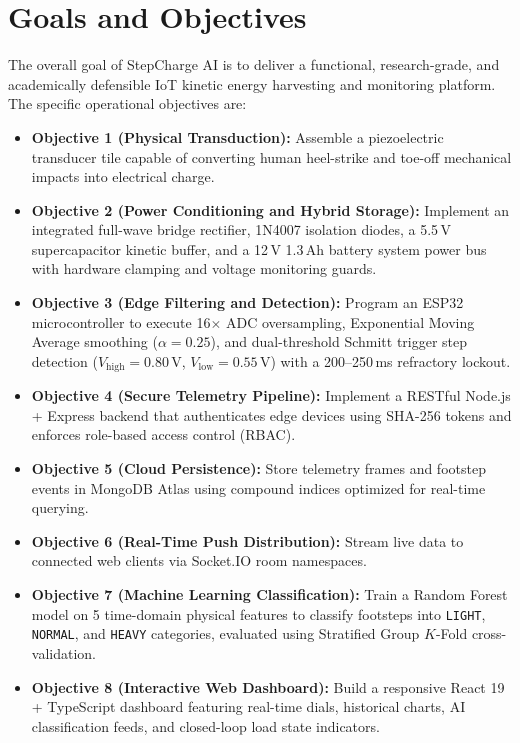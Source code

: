\section{Goals and Objectives}
The overall goal of StepCharge AI is to deliver a functional, research-grade, and academically defensible IoT kinetic energy harvesting and monitoring platform. The specific operational objectives are:
\begin{itemize}
    \item \textbf{Objective 1 (Physical Transduction):} Assemble a piezoelectric transducer tile capable of converting human heel-strike and toe-off mechanical impacts into electrical charge.
    \item \textbf{Objective 2 (Power Conditioning and Hybrid Storage):} Implement an integrated full-wave bridge rectifier, 1N4007 isolation diodes, a 5.5\,V supercapacitor kinetic buffer, and a 12\,V 1.3\,Ah battery system power bus with hardware clamping and voltage monitoring guards.
    \item \textbf{Objective 3 (Edge Filtering and Detection):} Program an ESP32 microcontroller to execute 16$\times$ ADC oversampling, Exponential Moving Average smoothing ($\alpha = 0.25$), and dual-threshold Schmitt trigger step detection ($V_{\text{high}} = 0.80\,\text{V}$, $V_{\text{low}} = 0.55\,\text{V}$) with a 200--250\,ms refractory lockout.
    \item \textbf{Objective 4 (Secure Telemetry Pipeline):} Implement a RESTful Node.js + Express backend that authenticates edge devices using SHA-256 tokens and enforces role-based access control (RBAC).
    \item \textbf{Objective 5 (Cloud Persistence):} Store telemetry frames and footstep events in MongoDB Atlas using compound indices optimized for real-time querying.
    \item \textbf{Objective 6 (Real-Time Push Distribution):} Stream live data to connected web clients via Socket.IO room namespaces.
    \item \textbf{Objective 7 (Machine Learning Classification):} Train a Random Forest model on 5 time-domain physical features to classify footsteps into \texttt{LIGHT}, \texttt{NORMAL}, and \texttt{HEAVY} categories, evaluated using Stratified Group $K$-Fold cross-validation.
    \item \textbf{Objective 8 (Interactive Web Dashboard):} Build a responsive React 19 + TypeScript dashboard featuring real-time dials, historical charts, AI classification feeds, and closed-loop load state indicators.
\end{itemize}

